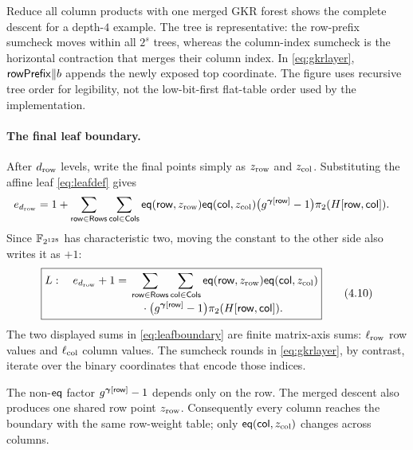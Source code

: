 \begin{step}{Reduce all column products with one merged GKR forest}{%
}
 shows the complete descent for a depth-$4$ example.  The
tree is representative: the row-prefix sumcheck moves within all $2^s$ trees,
whereas the column-index sumcheck is the horizontal contraction that merges
their column index.  In \eqref{eq:gkrlayer}, $\mathsf{rowPrefix}\Vert b$ appends the
newly exposed top coordinate.  The figure uses recursive tree order for
legibility, not the low-bit-first flat-table order used by the implementation.



\paragraph{The final leaf boundary.}
After $d_{\mathrm{row}}$ levels, write the final points simply as $z_{\mathrm{row}}$ and $z_{\mathrm{col}}$.
Substituting the affine leaf \eqref{eq:leafdef} gives
\begin{align*}
  e_{d_{\mathrm{row}}}
    &=1+
      \sum_{\mathsf{row}\in\mathsf{Rows}}\sum_{\mathsf{col}\in\mathsf{Cols}}
      \mathsf{eq}(\mathsf{row},z_{\mathrm{row}})\mathsf{eq}(\mathsf{col},z_{\mathrm{col}})
      \bigl(g^{\bm{\gamma}[\mathsf{row}]}-1\bigr)
      \pi_2(H[\mathsf{row},\mathsf{col}]).
\end{align*}
Since $\mathbb{F}_{2^{128}}$ has characteristic two, moving the constant to the other side
also writes it as $+1$:
\[
  \boxed{\begin{aligned}
  L:\quad e_{d_{\mathrm{row}}}+1
  ={}&\sum_{\mathsf{row}\in\mathsf{Rows}}\sum_{\mathsf{col}\in\mathsf{Cols}}
      \mathsf{eq}(\mathsf{row},z_{\mathrm{row}})\mathsf{eq}(\mathsf{col},z_{\mathrm{col}})\\[-2pt]
     &\quad\cdot\bigl(g^{\bm{\gamma}[\mathsf{row}]}-1\bigr)
      \pi_2(H[\mathsf{row},\mathsf{col}]).
  \end{aligned}}                                  \tag{4.10}\label{eq:leafboundary}
\]
The two displayed sums in \eqref{eq:leafboundary} are finite matrix-axis sums:
$\ell_{\mathrm{row}}$ row values and $\ell_{\mathrm{col}}$ column values.  The sumcheck rounds in
\eqref{eq:gkrlayer}, by contrast, iterate over the binary coordinates that encode those
indices.

\begin{remark}
\label{rem:sharedv}
The non-$\mathsf{eq}$ factor $g^{\bm{\gamma}[\mathsf{row}]}-1$ depends only on the row.  The
merged descent also produces one shared row point $z_{\mathrm{row}}$.  Consequently every
column reaches the boundary with the same row-weight table; only
$\mathsf{eq}(\mathsf{col},z_{\mathrm{col}})$ changes across columns.
\end{remark}

\end{step}

